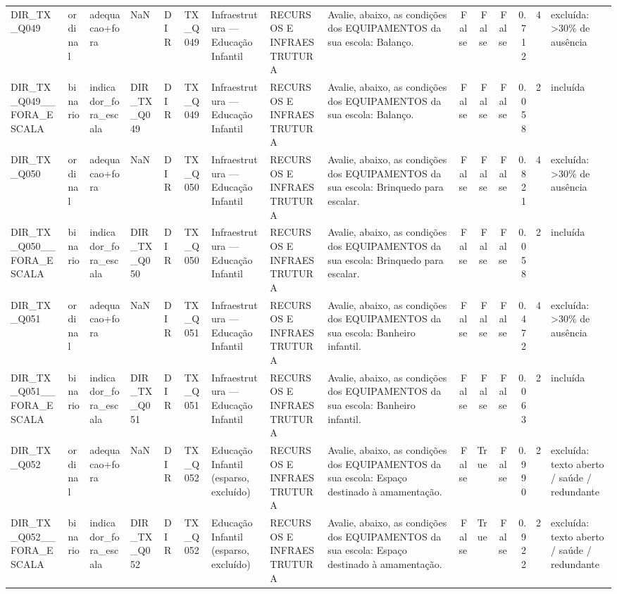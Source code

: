 \begin{tabular}{lllllllllrrrrrl}
DIR\_TX\_Q049 & ordinal & adequacao+fora & NaN & DIR & TX\_Q049 & Infraestrutura — Educação Infantil & RECURSOS E INFRAESTRUTURA & Avalie, abaixo, as condições dos EQUIPAMENTOS da sua escola: Balanço. & False & False & False & 0.712 & 4 & excluída: >30\% de ausência \\
DIR\_TX\_Q049\_\_FORA\_ESCALA & binario & indicador\_fora\_escala & DIR\_TX\_Q049 & DIR & TX\_Q049 & Infraestrutura — Educação Infantil & RECURSOS E INFRAESTRUTURA & Avalie, abaixo, as condições dos EQUIPAMENTOS da sua escola: Balanço. & False & False & False & 0.058 & 2 & incluída \\
DIR\_TX\_Q050 & ordinal & adequacao+fora & NaN & DIR & TX\_Q050 & Infraestrutura — Educação Infantil & RECURSOS E INFRAESTRUTURA & Avalie, abaixo, as condições dos EQUIPAMENTOS da sua escola:  Brinquedo para escalar. & False & False & False & 0.821 & 4 & excluída: >30\% de ausência \\
DIR\_TX\_Q050\_\_FORA\_ESCALA & binario & indicador\_fora\_escala & DIR\_TX\_Q050 & DIR & TX\_Q050 & Infraestrutura — Educação Infantil & RECURSOS E INFRAESTRUTURA & Avalie, abaixo, as condições dos EQUIPAMENTOS da sua escola:  Brinquedo para escalar. & False & False & False & 0.058 & 2 & incluída \\
DIR\_TX\_Q051 & ordinal & adequacao+fora & NaN & DIR & TX\_Q051 & Infraestrutura — Educação Infantil & RECURSOS E INFRAESTRUTURA & Avalie, abaixo, as condições dos EQUIPAMENTOS da sua escola: Banheiro infantil. & False & False & False & 0.472 & 4 & excluída: >30\% de ausência \\
DIR\_TX\_Q051\_\_FORA\_ESCALA & binario & indicador\_fora\_escala & DIR\_TX\_Q051 & DIR & TX\_Q051 & Infraestrutura — Educação Infantil & RECURSOS E INFRAESTRUTURA & Avalie, abaixo, as condições dos EQUIPAMENTOS da sua escola: Banheiro infantil. & False & False & False & 0.063 & 2 & incluída \\
DIR\_TX\_Q052 & ordinal & adequacao+fora & NaN & DIR & TX\_Q052 & Educação Infantil (esparso, excluído) & RECURSOS E INFRAESTRUTURA & Avalie, abaixo, as condições dos EQUIPAMENTOS da sua escola: Espaço destinado à amamentação. & False & True & False & 0.990 & 2 & excluída: texto aberto / saúde / redundante \\
DIR\_TX\_Q052\_\_FORA\_ESCALA & binario & indicador\_fora\_escala & DIR\_TX\_Q052 & DIR & TX\_Q052 & Educação Infantil (esparso, excluído) & RECURSOS E INFRAESTRUTURA & Avalie, abaixo, as condições dos EQUIPAMENTOS da sua escola: Espaço destinado à amamentação. & False & True & False & 0.922 & 2 & excluída: texto aberto / saúde / redundante \\

\end{tabular}
